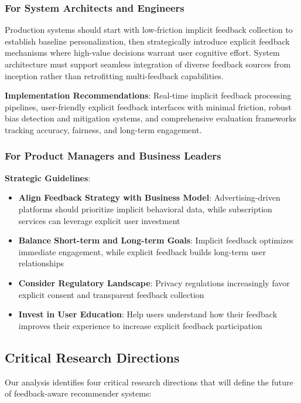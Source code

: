 \subsubsection{For System Architects and Engineers}

Production systems should start with low-friction implicit feedback collection to establish baseline personalization, then strategically introduce explicit feedback mechanisms where high-value decisions warrant user cognitive effort. System architecture must support seamless integration of diverse feedback sources from inception rather than retrofitting multi-feedback capabilities.

\textbf{Implementation Recommendations}: Real-time implicit feedback processing pipelines, user-friendly explicit feedback interfaces with minimal friction, robust bias detection and mitigation systems, and comprehensive evaluation frameworks tracking accuracy, fairness, and long-term engagement.

\subsubsection{For Product Managers and Business Leaders}

\textbf{Strategic Guidelines}:
\begin{itemize}
    \item \textbf{Align Feedback Strategy with Business Model}: Advertising-driven platforms should prioritize implicit behavioral data, while subscription services can leverage explicit user investment
    \item \textbf{Balance Short-term and Long-term Goals}: Implicit feedback optimizes immediate engagement, while explicit feedback builds long-term user relationships
    \item \textbf{Consider Regulatory Landscape}: Privacy regulations increasingly favor explicit consent and transparent feedback collection
    \item \textbf{Invest in User Education}: Help users understand how their feedback improves their experience to increase explicit feedback participation
\end{itemize}

\subsection{Critical Research Directions}

Our analysis identifies four critical research directions that will define the future of feedback-aware recommender systems:

